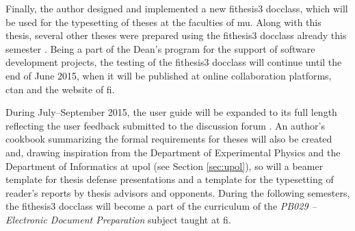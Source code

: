 \documentclass[digital,table,color]{fithesis3/fithesis3}
\begin{document}
Finally, the author designed and implemented a new
\textsf{fithesis3} \gls{docclass}, which will be used for the
typesetting of theses at the faculties of \gls{mu}. Along with this
thesis, several other theses were prepared using the
\textsf{fithesis3} \gls{docclass} already this semester
\cite{kovanda15,zvolanek15,rucka15}. Being a part of the Dean's
program for the support of software development projects, the
testing of the \textsf{fithesis3} \gls{docclass} will continue
until the end of June 2015, when it will be published at online
collaboration platforms, \gls{ctan} and the website of \gls{fi}.

During July--September 2015, the user guide will be expanded to its
full length reflecting the user feedback submitted to the
discussion forum \cite{fithesisForum}. An author's cookbook
summarizing the formal requirements for theses will also be created
and, drawing inspiration from the Department of Experimental
Physics and the Department of Informatics at \gls{upol} (see
Section \ref{sec:upol}), so will a \gls{beamer} template for thesis
defense presentations and a template for the typesetting of
reader's reports by thesis advisors and opponents. During the
following semesters, the \textsf{fithesis3} \gls{docclass} will
become a part of the curriculum of the \emph{PB029 -- Electronic
Document Preparation} subject taught at \gls{fi}.
\end{document}
